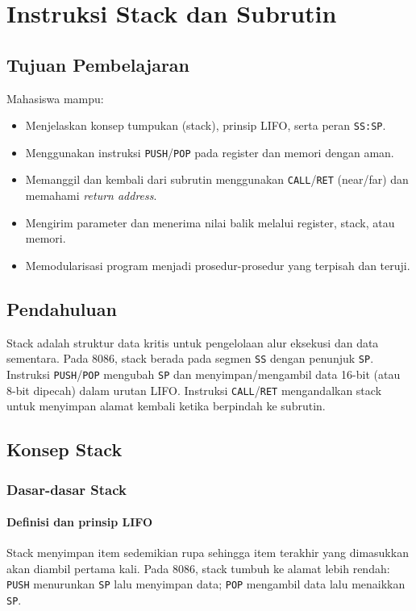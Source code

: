 \documentclass[../main.tex]{subfiles}
\begin{document}
\chapter{Instruksi Stack dan Subrutin}

\section{Tujuan Pembelajaran}
Mahasiswa mampu:
\begin{itemize}
    \item Menjelaskan konsep tumpukan (stack), prinsip LIFO, serta peran \texttt{SS:SP}.
    \item Menggunakan instruksi \texttt{PUSH}/\texttt{POP} pada register dan memori dengan aman.
    \item Memanggil dan kembali dari subrutin menggunakan \texttt{CALL}/\texttt{RET} (near/far) dan memahami \textit{return address}.
    \item Mengirim parameter dan menerima nilai balik melalui register, stack, atau memori.
    \item Memodularisasi program menjadi prosedur-prosedur yang terpisah dan teruji.
\end{itemize}

\section{Pendahuluan}
Stack adalah struktur data kritis untuk pengelolaan alur eksekusi dan data sementara. Pada 8086, stack berada pada segmen \texttt{SS} dengan penunjuk \texttt{SP}. Instruksi \texttt{PUSH}/\texttt{POP} mengubah \texttt{SP} dan menyimpan/mengambil data 16-bit (atau 8-bit dipecah) dalam urutan LIFO. Instruksi \texttt{CALL}/\texttt{RET} mengandalkan stack untuk menyimpan alamat kembali ketika berpindah ke subrutin.

\section{Konsep Stack}
\subsection{Dasar-dasar Stack}
\subsubsection{Definisi dan prinsip LIFO}
Stack menyimpan item sedemikian rupa sehingga item terakhir yang dimasukkan akan diambil pertama kali. Pada 8086, stack tumbuh ke alamat lebih rendah: \texttt{PUSH} menurunkan \texttt{SP} lalu menyimpan data; \texttt{POP} mengambil data lalu menaikkan \texttt{SP}.
\end{document}
